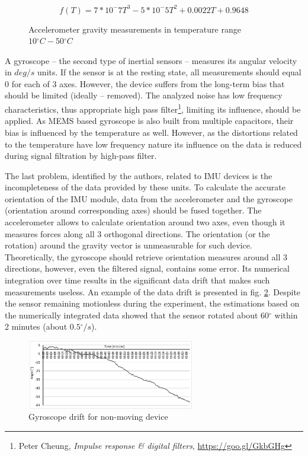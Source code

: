 \documentclass[sensors,article,submit,moreauthors,pdftex,10pt,a4paper]{mdpi}
\newcommand{\degree}{\ensuremath{{}^{\circ}}\xspace}
\begin{document}
\begin{equation}
	f(T) = 7*10^-7 T^3 - 5*10^-5 T^2 + 0.0022T + 0.9648
	\label{eq:kinect:gravityTempModel}
\end{equation}
	
\begin{figure}[H] %
	\centering
		
	\caption{Accelerometer gravity measurements in temperature range $10\degree C - 50\degree C$}
	\label{fig:imu:tmep}
\end{figure}
	
A gyroscope – the second type of inertial sensors – measures its angular velocity in $deg/s$  units. If the sensor is at the resting state, all measurements should equal 0 for each of 3 axes. However, the device suffers from the long-term bias that should be limited (ideally – removed). The analyzed noise has low frequency characteristics, thus appropriate high pass filter\footnote{Peter Cheung, \textit{Impulse response \& digital filters}, \url{https://goo.gl/GkbGHg}}, limiting its influence, should be applied. As MEMS based gyroscope is also built from multiple capacitors, their bias is influenced by the temperature as well. However, as the distortions related to the temperature have low frequency nature its influence on the data is reduced during signal filtration by high-pass filter. 
	
The last problem, identified by the authors, related to IMU devices is the incompleteness of the data provided by these units. To calculate the accurate orientation of the IMU module, data from the accelerometer and the gyroscope (orientation around corresponding axes) should be fused together. The accelerometer allows to calculate orientation around two axes, even though it measures forces along all 3 orthogonal directions. The orientation (or the rotation) around the gravity vector is unmeasurable for such device. Theoretically, the gyroscope should retrieve orientation measures around all 3 directions, however, even the filtered signal, contains some error. Its numerical integration over time results in the significant data drift that makes such measurements useless. An example of the data drift is presented in fig. \ref{fig:imu:drift}. Despite the sensor remaining motionless during the experiment, the estimations based on the numerically integrated data showed that the sensor rotated about $60\degree$ within 2 minutes (about $0.5\degree/s$).
\begin{figure}[H] %
	\centering
	\includegraphics[width=0.65\textwidth]{Figure7.png}
	\caption{Gyroscope drift for non-moving device}
	\label{fig:imu:drift}
\end{figure}
	
\end{document}
